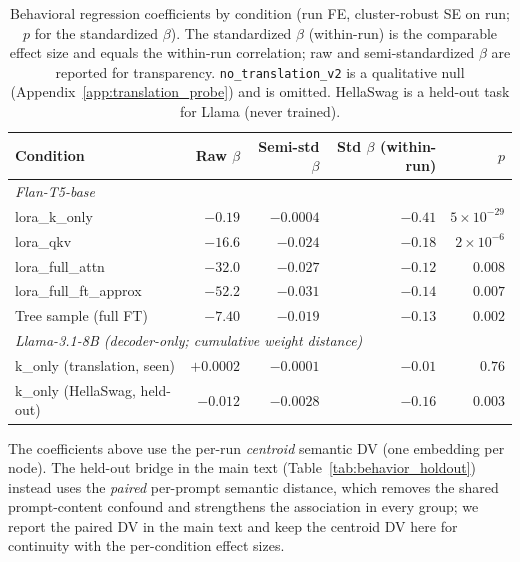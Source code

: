 \documentclass{article}
\theoremstyle{definition}
\theoremstyle{plain}
\begin{document}
\begin{table}[h]
\caption{Behavioral regression coefficients by condition (run FE, cluster-robust SE on run; $p$ for
  the standardized $\beta$). The standardized $\beta$ (within-run) is the comparable effect size and
  equals the within-run correlation; raw and semi-standardized $\beta$ are reported for transparency.
  \texttt{no\_translation\_v2} is a qualitative null (Appendix~\ref{app:translation_probe}) and is
  omitted. HellaSwag is a held-out task for Llama (never trained).}
\label{tab:regression_betas}
\begin{center}
\begin{tabular}{lrrrr}
\toprule
Condition & Raw $\beta$ & Semi-std $\beta$ & Std $\beta$ (within-run) & $p$ \\
\midrule
\multicolumn{5}{l}{\textit{Flan-T5-base}} \\
lora\_k\_only          & $-0.19$  & $-0.0004$ & $-0.41$ & $5\!\times\!10^{-29}$ \\
lora\_qkv              & $-16.6$  & $-0.024$  & $-0.18$ & $2\!\times\!10^{-6}$ \\
lora\_full\_attn       & $-32.0$  & $-0.027$  & $-0.12$ & $0.008$ \\
lora\_full\_ft\_approx & $-52.2$  & $-0.031$  & $-0.14$ & $0.007$ \\
Tree sample (full FT)  & $-7.40$  & $-0.019$  & $-0.13$ & $0.002$ \\
\midrule
\multicolumn{5}{l}{\textit{Llama-3.1-8B (decoder-only; cumulative weight distance)}} \\
k\_only (translation, seen)   & $+0.0002$ & $-0.0001$ & $-0.01$ & $0.76$ \\
k\_only (HellaSwag, held-out) & $-0.012$  & $-0.0028$ & $-0.16$ & $0.003$ \\
\bottomrule
\end{tabular}
\end{center}
\end{table}

The coefficients above use the per-run \emph{centroid} semantic DV (one embedding per node). The
held-out bridge in the main text (Table~\ref{tab:behavior_holdout}) instead uses the \emph{paired}
per-prompt semantic distance, which removes the shared prompt-content confound and strengthens the
association in every group; we report the paired DV in the main text and keep the centroid DV here for
continuity with the per-condition effect sizes.
\end{document}
